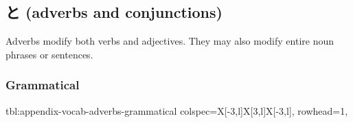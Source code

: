 \documentclass[../nihongo-gakushuu-kyouzai.tex]{subfiles}
\begin{document}
\appendix
\setcounter{section}{2}
\setcounter{subsection}{4}

\subsection{と (adverbs and conjunctions)}
Adverbs modify both verbs and adjectives. They may also modify entire noun phrases or sentences.


\subsubsection{Grammatical}
{tbl:appendix-vocab-adverbs-grammatical}  %
{}  %
{
    colspec={X[-3,l]X[3,l]X[-3,l]},
    rowhead=1,
}  %
\end{document}
